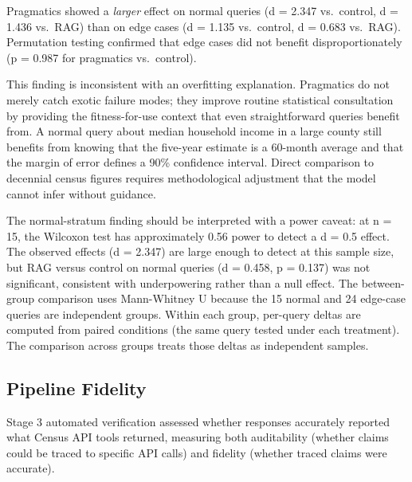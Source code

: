 \documentclass[
  11pt,
  letterpaper,
]{article}
\begin{document}
Pragmatics showed a \emph{larger} effect on normal queries (d = 2.347
vs.~control, d = 1.436 vs.~RAG) than on edge cases (d = 1.135
vs.~control, d = 0.683 vs.~RAG). Permutation testing confirmed that edge
cases did not benefit disproportionately (p = 0.987 for pragmatics
vs.~control).

This finding is inconsistent with an overfitting explanation. Pragmatics
do not merely catch exotic failure modes; they improve routine
statistical consultation by providing the fitness-for-use context that
even straightforward queries benefit from. A normal query about median
household income in a large county still benefits from knowing that the
five-year estimate is a 60-month average and that the margin of error
defines a 90\% confidence interval. Direct comparison to decennial
census figures requires methodological adjustment that the model cannot
infer without guidance.

The normal-stratum finding should be interpreted with a power caveat: at
n = 15, the Wilcoxon test has approximately 0.56 power to detect a d =
0.5 effect. The observed effects (d = 2.347) are large enough to detect
at this sample size, but RAG versus control on normal queries (d =
0.458, p = 0.137) was not significant, consistent with underpowering
rather than a null effect. The between-group comparison uses
Mann-Whitney U because the 15 normal and 24 edge-case queries are
independent groups. Within each group, per-query deltas are computed
from paired conditions (the same query tested under each treatment). The
comparison across groups treats those deltas as independent samples.

\subsection{Pipeline Fidelity}\label{pipeline-fidelity}

Stage 3 automated verification assessed whether responses accurately
reported what Census API tools returned, measuring both auditability
(whether claims could be traced to specific API calls) and fidelity
(whether traced claims were accurate).
\end{document}
